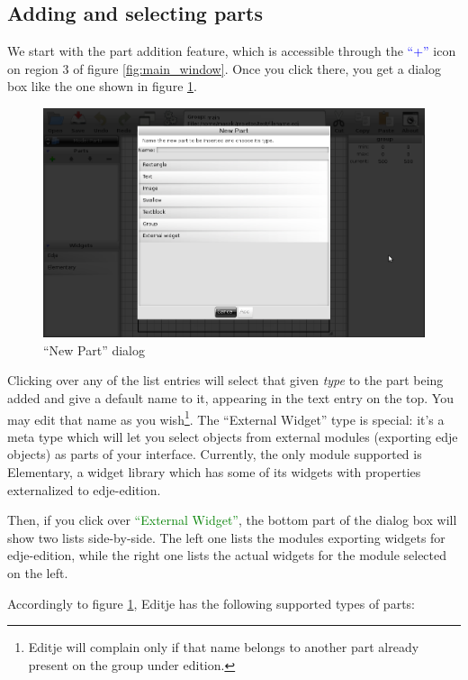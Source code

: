 \documentclass[a4paper]{profusion}
\newcommand{\GUIButton}[1]{\textcolor{green}{#1}} %
\newcommand{\GUIIcon}[1]{\textcolor{blue}{#1}}    %
\begin{document}
\subsection{Adding and selecting parts}

 We start with the part addition feature, which is accessible through
 the \GUIIcon{``+''} icon on region 3 of figure
 \ref{fig:main_window}. Once you click there, you get a dialog box
 like the one shown in figure \ref{fig:add_part_box}.

\begin{figure}[h!]
  \centering
  \includegraphics[width=1.0\textwidth]{images/add_part.png}
  \caption{``New Part'' dialog}
  \label{fig:add_part_box}
\end{figure}

Clicking over any of the list entries will select that given
\emph{type} to the part being added and give a default name to it,
appearing in the text entry on the top. You may edit that name as you
wish\footnote{Editje will complain only if that name belongs to
  another part already present on the group under edition.}. The
``External Widget'' type is special: it's a meta type which will let
you select objects from external modules (exporting edje objects) as
parts of your interface. Currently, the only module supported is
Elementary, a widget library which has some of its widgets with
properties externalized to edje-edition.

Then, if you click over \GUIButton{``External Widget''}, the bottom
part of the dialog box will show two lists side-by-side. The left one
lists the modules exporting widgets for edje-edition, while the right
one lists the actual widgets for the module selected on the left.

Accordingly to figure \ref{fig:add_part_box}, Editje has the following
supported types of parts:
\end{document}
